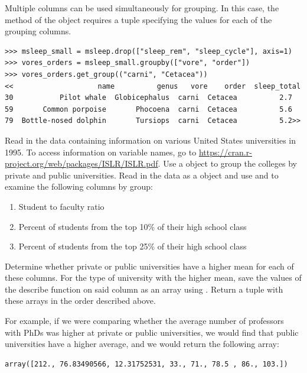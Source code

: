 Multiple columns can be used simultaneously for grouping.
In this case, the  method of the  object requires a tuple specifying the values for each of the grouping columns.

\begin{lstlisting}
>>> msleep_small = msleep.drop(["sleep_rem", "sleep_cycle"], axis=1)
>>> vores_orders = msleep_small.groupby(["vore", "order"])
>>> vores_orders.get_group(("carni", "Cetacea"))
<<                    name          genus   vore    order  sleep_total
30           Pilot whale  Globicephalus  carni  Cetacea          2.7
59       Common porpoise       Phocoena  carni  Cetacea          5.6
79  Bottle-nosed dolphin       Tursiops  carni  Cetacea          5.2>>
\end{lstlisting}

\begin{problem}
Read in the data  containing information on various United States universities in 1995.
To access information on variable names, go to \url{https://cran.r-project.org/web/packages/ISLR/ISLR.pdf}.
Use a  object to group the colleges by private and public universities.
Read in the data as a  object and use  and  to examine the following columns by group:
\begin{enumerate}
\item Student to faculty ratio
\item Percent of students from the top 10\% of their high school class
\item Percent of students from the top 25\% of their high school class
\end{enumerate}
Determine whether private or public universities have a higher mean for each of these columns.
For the type of university with the higher mean, save the values of the describe function on said column as an array using .
Return a tuple with these arrays in the order described above.

For example, if we were comparing whether the average number of professors with PhDs was higher at private or public universities, we would find that public universities have a higher average, and we would return the following array:

\begin{lstlisting}
array([212., 76.83490566, 12.31752531, 33., 71., 78.5 , 86., 103.])
\end{lstlisting}




\end{problem}

